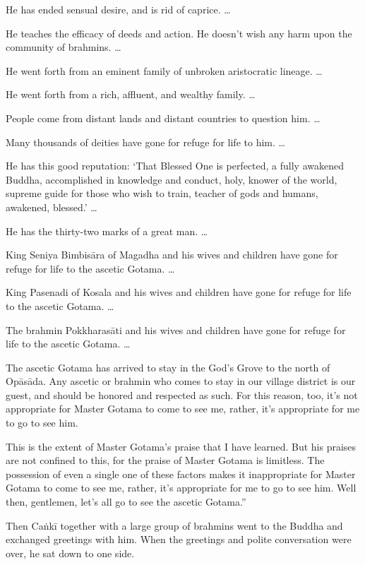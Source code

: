 \documentclass[12pt,openany]{book}%
\begin{document}
He has ended sensual desire, and is rid of caprice. … 

He teaches the efficacy of deeds and action. He doesn’t wish any harm upon the community of brahmins. … 

He went forth from an eminent family of unbroken aristocratic lineage. … 

He went forth from a rich, affluent, and wealthy family. … 

People come from distant lands and distant countries to question him. … 

Many thousands of deities have gone for refuge for life to him. … 

He has this good reputation: ‘That Blessed One is perfected, a fully awakened Buddha, accomplished in knowledge and conduct, holy, knower of the world, supreme guide for those who wish to train, teacher of gods and humans, awakened, blessed.’ … 

He has the thirty-two marks of a great man. … 

King Seniya \textsanskrit{Bimbisāra} of Magadha and his wives and children have gone for refuge for life to the ascetic Gotama. … 

King Pasenadi of Kosala and his wives and children have gone for refuge for life to the ascetic Gotama. … 

The brahmin \textsanskrit{Pokkharasāti} and his wives and children have gone for refuge for life to the ascetic Gotama. … 

The ascetic Gotama has arrived to stay in the God’s Grove to the north of \textsanskrit{Opāsāda}. Any ascetic or brahmin who comes to stay in our village district is our guest, and should be honored and respected as such. For this reason, too, it’s not appropriate for Master Gotama to come to see me, rather, it’s appropriate for me to go to see him. 

This is the extent of Master Gotama’s praise that I have learned. But his praises are not confined to this, for the praise of Master Gotama is limitless. The possession of even a single one of these factors makes it inappropriate for Master Gotama to come to see me, rather, it’s appropriate for me to go to see him. Well then, gentlemen, let’s all go to see the ascetic Gotama.” 

Then \textsanskrit{Caṅkī} together with a large group of brahmins went to the Buddha and exchanged greetings with him. When the greetings and polite conversation were over, he sat down to one side. 
\end{document}
